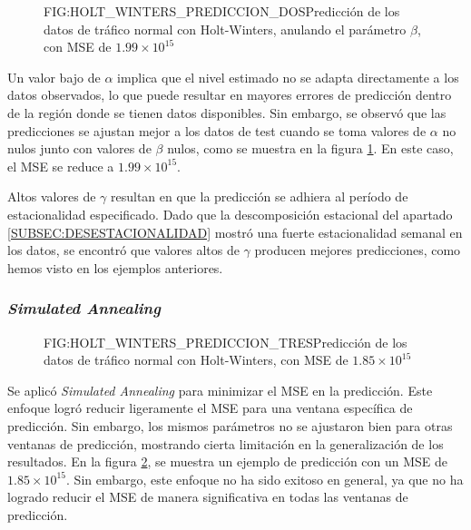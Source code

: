 \begin{figure}[Predicción de los datos de tráfico normal con Holt-Winters, anulando el parámetro $\beta$]{FIG:HOLT_WINTERS_PREDICCION_DOS}{Predicción de los datos de tráfico normal con Holt-Winters, anulando el parámetro $\beta$, con \ac{MSE} de $1.99\times 10^{15}$}
    \label{FIG:HOLT_WINTERS_PREDICCION_DOS}
\end{figure}

Un valor bajo de $\alpha$ implica que el nivel estimado no se adapta directamente a los datos observados, lo que puede resultar en mayores errores de predicción dentro de la región donde se tienen datos disponibles. Sin embargo, se observó que las predicciones se ajustan mejor a los datos de test cuando se toma valores de $\alpha$ no nulos junto con valores de $\beta$ nulos, como se muestra en la figura \ref{FIG:HOLT_WINTERS_PREDICCION_DOS}. En este caso, el \ac{MSE} se reduce a $1.99\times 10^{15}$.

Altos valores de $\gamma$ resultan en que la predicción se adhiera al período de estacionalidad especificado.
Dado que la descomposición estacional del apartado \ref{SUBSEC:DESESTACIONALIDAD} mostró una fuerte estacionalidad semanal en los datos, se encontró que valores altos de $\gamma$ producen mejores predicciones, como hemos visto en los ejemplos anteriores.

\subsubsection{\textit{Simulated Annealing}}

\begin{figure}[Predicción de los datos de tráfico normal con Holt-Winters, con MSE de $1.85\times 10^{15}$]{FIG:HOLT_WINTERS_PREDICCION_TRES}{Predicción de los datos de tráfico normal con Holt-Winters, con \ac{MSE} de $1.85\times 10^{15}$}
    \label{FIG:HOLT_WINTERS_PREDICCION_TRES}
\end{figure}

Se aplicó \textit{Simulated Annealing} para minimizar el MSE en la predicción. Este enfoque logró reducir ligeramente el MSE para una ventana específica de predicción. Sin embargo, los mismos parámetros no se ajustaron bien para otras ventanas de predicción, mostrando cierta limitación en la generalización de los resultados. En la figura \ref{FIG:HOLT_WINTERS_PREDICCION_TRES}, se muestra un ejemplo de predicción con un MSE de $1.85\times 10^{15}$. Sin embargo, este enfoque no ha sido exitoso en general, ya que no ha logrado reducir el MSE de manera significativa en todas las ventanas de predicción.